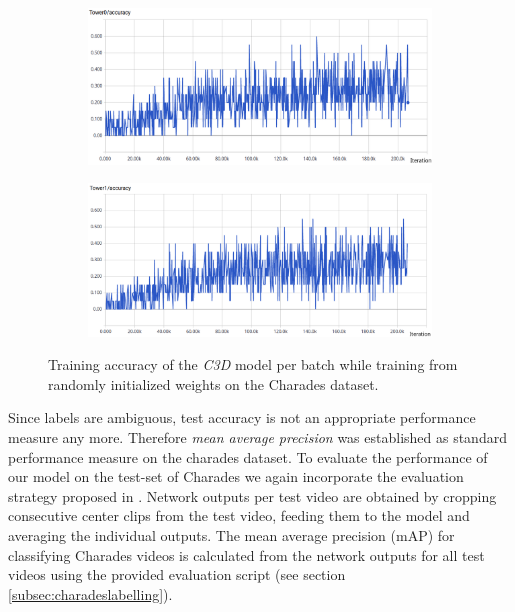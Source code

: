 \begin{figure}[H]
    \begin{subfigure}[c]{\textwidth}
    \centering
    \includegraphics[width=\textwidth]{img_evaluation/charades_scratch/tower0accuracy}
    \end{subfigure}
    \begin{subfigure}[c]{\textwidth}
    \includegraphics[width=\textwidth]{img_evaluation/charades_scratch/tower1accuracy}
    \end{subfigure}
    \caption{Training accuracy of the \textit{C3D} model per batch while training from randomly initialized weights on the Charades dataset.}
    \label{fig:charadesscratchaccuracy}
\end{figure}

Since labels are ambiguous, test accuracy is not an appropriate performance measure any more.
Therefore \textit{mean average precision}\cite{zhu_recall_2004} was established as standard performance measure on the charades dataset.
To evaluate the performance of our model on the test-set of Charades we again incorporate the evaluation strategy proposed in \cite{carreira_quo_2017}.
Network outputs per test video are obtained by cropping consecutive center clips from the test video, feeding them to the model and averaging the individual outputs.
The mean average precision (mAP) for classifying Charades videos is calculated from the network outputs for all test videos using the provided evaluation script (see section \ref{subsec:charadeslabelling}).

